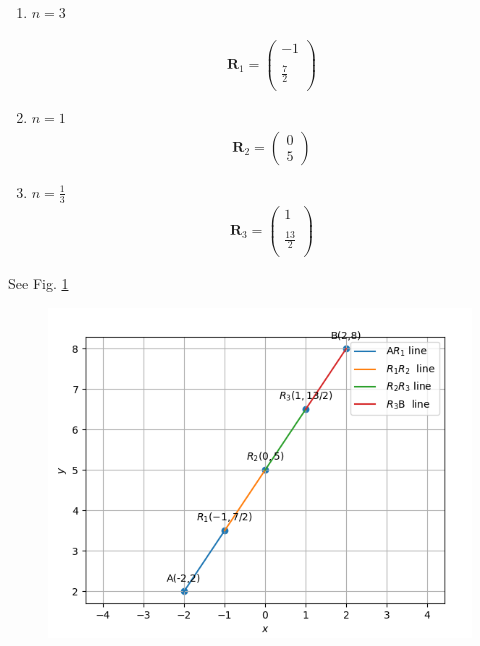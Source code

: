 \documentclass[12pt]{article}
\newcommand{\myvec}[1]{\ensuremath{\begin{pmatrix}#1\end{pmatrix}}}
\let\vec\mathbf
\begin{document}
\begin{enumerate}

\item $n = 3$
    
\begin{align}
\vec{R}_1=
\myvec{
-1\\
\\
\frac{7}{2}\\
}
\end{align}

\item $n = 1$
\begin{align}
\vec{R}_2
=\myvec{
0\\
5
}
\end{align}

\item $n=\frac{1}{3}$
\begin{align}
\vec{R}_3
=\myvec{
1\\
\\
\frac{13}{2}\\
}
\end{align}

\end{enumerate}
See Fig. 
\ref{fig:chapters/10/7/2/9/Fig}
\begin{figure}[!h]
\begin{center}
   \includegraphics[width=\columnwidth]{chapters/10/7/2/9/figs/10.7.2.9.png}
\end{center}
\caption{}
\label{fig:chapters/10/7/2/9/Fig}
\end{figure}
\end{document}
